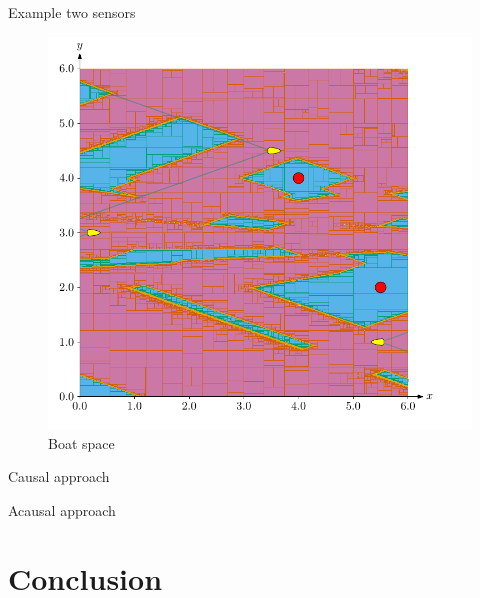 \documentclass{beamer}
\begin{document}
\begin{frame}{Example two sensors}
\begin{minipage}{0.45\textwidth}
\begin{figure}
                        \includegraphics[width=\textwidth]{imgs/ex_boat_space}
                        \caption{Boat space}
                \end{figure}
            \end{minipage}
        \end{frame}

        \begin{frame}{Causal approach}
            
        \end{frame}

        \begin{frame}{Acausal approach}
            
        \end{frame}

    \section{Conclusion}
\end{document}
